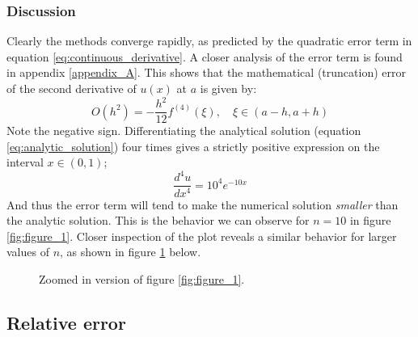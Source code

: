 \documentclass[a4paper, 10pt]{article}
\begin{document}
\subsubsection{Discussion}
Clearly the methods converge rapidly, as predicted by the quadratic error term in equation \ref{eq:continuous_derivative}. A closer analysis of the error term is found in appendix \ref{appendix_A}. This shows that the mathematical (truncation) error of the second derivative of $u(x)$ at $a$ is given by:
\begin{equation}
O(h^2)= -\frac{h^2}{12}f^{(4)}(\xi), \quad \xi \in (a-h, a+h)
\end{equation}
Note the negative sign. Differentiating the analytical solution (equation \ref{eq:analytic_solution}) four times gives a strictly positive expression on the interval $x\in (0,1)$;
$$\frac{d^4 u}{dx^4}=10^4 e^{-10x}$$
And thus the error term will tend to make the numerical solution \textit{smaller} than the analytic solution. This is the behavior we can observe for $n=10$ in figure \ref{fig:figure_1}. Closer inspection of the plot reveals a similar behavior for larger values of $n$, as shown in figure \ref{fig:figure_2} below.
\begin{center}
\begin{figure}[h]
\caption{Zoomed in version of figure \ref{fig:figure_1}.} 
\label{fig:figure_2}
\end{figure}
\end{center}
\pagebreak
\subsection{Relative error}
\end{document}

